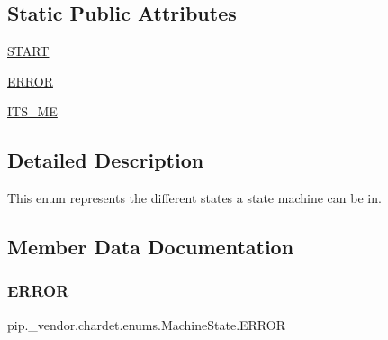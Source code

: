 \subsection*{Static Public Attributes}
\begin{DoxyCompactItemize}
\item 
\hyperlink{classpip_1_1__vendor_1_1chardet_1_1enums_1_1MachineState_abb5b63be135893f116fb4d9352868e65}{S\+T\+A\+RT}
\item 
\hyperlink{classpip_1_1__vendor_1_1chardet_1_1enums_1_1MachineState_a2da3b39153952d56ce02fcad18e3d3c3}{E\+R\+R\+OR}
\item 
\hyperlink{classpip_1_1__vendor_1_1chardet_1_1enums_1_1MachineState_a2c73c51fbcd5f4651668d431d2746947}{I\+T\+S\+\_\+\+ME}
\end{DoxyCompactItemize}


\subsection{Detailed Description}
\begin{DoxyVerb}This enum represents the different states a state machine can be in.
\end{DoxyVerb}
 

\subsection{Member Data Documentation}
\mbox{\label{classpip_1_1__vendor_1_1chardet_1_1enums_1_1MachineState_a2da3b39153952d56ce02fcad18e3d3c3}} 
\subsubsection{\texorpdfstring{E\+R\+R\+OR}{ERROR}}
{\footnotesize\ttfamily pip.\+\_\+vendor.\+chardet.\+enums.\+Machine\+State.\+E\+R\+R\+OR\hspace{0.3cm}{\ttfamily [static]}}

\mbox{\label{classpip_1_1__vendor_1_1chardet_1_1enums_1_1MachineState_a2c73c51fbcd5f4651668d431d2746947}} 
